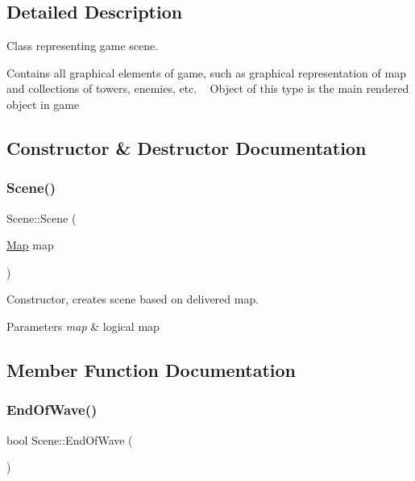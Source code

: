 \subsection{Detailed Description}
Class representing game scene. 

Contains all graphical elements of game, such as graphical representation of map and collections of towers, enemies, etc. ~\newline
Object of this type is the main rendered object in game 

\subsection{Constructor \& Destructor Documentation}
\mbox{\label{class_scene_a7a4f0004dce8380ca0e31f573a92d7f2}} 
\subsubsection{\texorpdfstring{Scene()}{Scene()}}
{\footnotesize\ttfamily Scene\+::\+Scene (\begin{DoxyParamCaption}\item[{\mbox{\hyperlink{class_map}{Map}}}]{map }\end{DoxyParamCaption})}



Constructor, creates scene based on delivered map. 


\begin{DoxyParams}{Parameters}
{\em map} & logical map \\
\hline
\end{DoxyParams}


\subsection{Member Function Documentation}
\mbox{\label{class_scene_ad868aeb65543a3bd92b722b976885549}} 
\subsubsection{\texorpdfstring{End\+Of\+Wave()}{EndOfWave()}}
{\footnotesize\ttfamily bool Scene\+::\+End\+Of\+Wave (\begin{DoxyParamCaption}{ }\end{DoxyParamCaption})}



